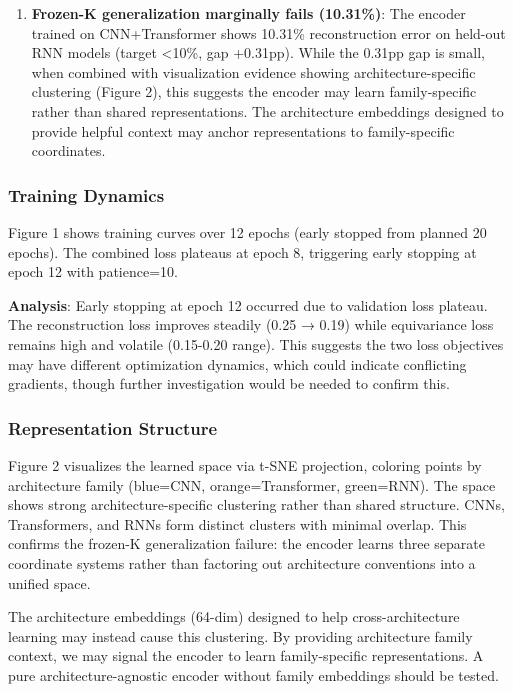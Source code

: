 \begin{enumerate}
\item \textbf{Frozen-K generalization marginally fails (10.31\%)}: The encoder trained on CNN+Transformer shows 10.31\% reconstruction error on held-out RNN models (target <10\%, gap +0.31pp). While the 0.31pp gap is small, when combined with visualization evidence showing architecture-specific clustering (Figure 2), this suggests the encoder may learn family-specific rather than shared representations. The architecture embeddings designed to provide helpful context may anchor representations to family-specific coordinates.
\end{enumerate}

\subsubsection{Training Dynamics}

Figure 1 shows training curves over 12 epochs (early stopped from planned 20 epochs). The combined loss plateaus at epoch 8, triggering early stopping at epoch 12 with patience=10.

\textbf{Analysis}: Early stopping at epoch 12 occurred due to validation loss plateau. The reconstruction loss improves steadily (0.25 → 0.19) while equivariance loss remains high and volatile (0.15-0.20 range). This suggests the two loss objectives may have different optimization dynamics, which could indicate conflicting gradients, though further investigation would be needed to confirm this.

\subsubsection{Representation Structure}

Figure 2 visualizes the learned space via t-SNE projection, coloring points by architecture family (blue=CNN, orange=Transformer, green=RNN). The space shows strong architecture-specific clustering rather than shared structure. CNNs, Transformers, and RNNs form distinct clusters with minimal overlap. This confirms the frozen-K generalization failure: the encoder learns three separate coordinate systems rather than factoring out architecture conventions into a unified space.

The architecture embeddings (64-dim) designed to help cross-architecture learning may instead cause this clustering. By providing architecture family context, we may signal the encoder to learn family-specific representations. A pure architecture-agnostic encoder without family embeddings should be tested.

